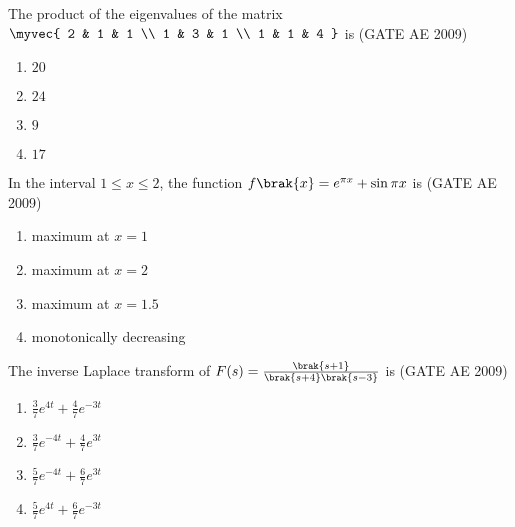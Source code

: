    \item The product of the eigenvalues of the matrix 
    $
    \myvec{
    2 & 1 & 1 \\
    1 & 3 & 1 \\
    1 & 1 & 4
    }
    $
    is \hfill (GATE AE 2009)
    \begin{multicols}{4}
        \begin{enumerate}
            \item $20$
            \item $24$
            \item $9$
            \item $17$
        \end{enumerate}
    \end{multicols}

    \item In the interval $1 \leq x \leq 2$, the function $f\brak{x} = e^{\pi x} + \sin \pi x$ is  \hfill (GATE AE 2009)
    \begin{multicols}{2}
        \begin{enumerate}
            \item maximum at $x=1$
            \item maximum at $x=2$
            \item maximum at $x=1.5$
            \item monotonically decreasing
        \end{enumerate}
    \end{multicols}

    \item The inverse Laplace transform of $F(s) = \frac{\brak{s+1}}{\brak{s+4}\brak{s-3}}$ is  \hfill (GATE AE 2009)
    \begin{multicols}{4}
        \begin{enumerate}
            \item $\frac{3}{7}e^{4t} + \frac{4}{7}{e^{-3t}}$
            \item $\frac{3}{7}e^{-4t} + \frac{4}{7}e^{3t}$
            \item $\frac{5}{7}e^{-4t} + \frac{6}{7}e^{3t}$
            \item $\frac{5}{7}e^{4t} + \frac{6}{7}{e^{-3t}}$
        \end{enumerate}
    \end{multicols}
